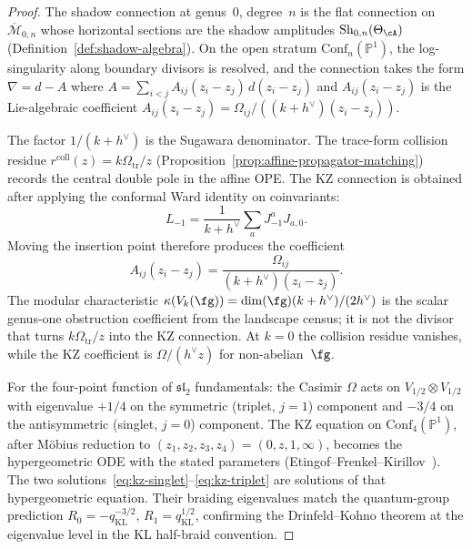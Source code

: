 \begin{proof}
The shadow connection at genus~$0$, degree~$n$ is the flat connection
on $\overline{\mathcal{M}}_{0,n}$ whose horizontal sections are
the shadow amplitudes $\operatorname{Sh}_{0,n}(\Theta_\cA)$
(Definition~\ref{def:shadow-algebra}). On the open stratum
$\mathrm{Conf}_n(\mathbb{P}^1)$, the log-singularity along boundary
divisors is resolved, and the connection takes the form
$\nabla = d - A$ where
$A = \sum_{i<j} A_{ij}(z_i-z_j)\, d(z_i-z_j)$
and $A_{ij}(z_i-z_j)$ is the Lie-algebraic coefficient
$A_{ij}(z_i-z_j) = \Omega_{ij}/((k + h^\vee)(z_i-z_j))$.

The factor $1/(k + h^\vee)$ is the Sugawara denominator. The
trace-form collision residue
$r^{\mathrm{coll}}(z)=k\Omega_{\mathrm{tr}}/z$
\textup{(}Proposition~\ref{prop:affine-propagator-matching}\textup{)}
records the central double pole in the affine OPE. The KZ
connection is obtained after applying the conformal Ward identity
on coinvariants:
\[
 L_{-1}
 = \frac{1}{k+h^\vee}\sum_a J^a_{-1}J_{a,0}.
\]
Moving the insertion point therefore produces the coefficient
\[
 A_{ij}(z_i-z_j)
 = \frac{\Omega_{ij}}{(k+h^\vee)(z_i-z_j)}.
\]
The modular characteristic
$\kappa(V_k(\fg))=\dim(\fg)(k+h^\vee)/(2h^\vee)$ is the scalar
genus-one obstruction coefficient from the landscape census; it is
not the divisor that turns
$k\Omega_{\mathrm{tr}}/z$ into the KZ connection. At $k=0$ the
collision residue vanishes, while the KZ coefficient is
$\Omega/(h^\vee z)$ for non-abelian~$\fg$.

For the four-point function of $\mathfrak{sl}_2$ fundamentals:
the Casimir $\Omega$ acts on $V_{1/2} \otimes V_{1/2}$ with
eigenvalue $+1/4$ on the symmetric (triplet, $j=1$) component
and $-3/4$ on the antisymmetric (singlet, $j=0$) component.
The KZ equation on $\mathrm{Conf}_4(\mathbb{P}^1)$, after
M\"obius reduction to $(z_1, z_2, z_3, z_4) = (0, z, 1, \infty)$,
becomes the hypergeometric ODE with the stated parameters
(Etingof--Frenkel--Kirillov~\cite{EFK98}).
The two solutions~\eqref{eq:kz-singlet}--\eqref{eq:kz-triplet} are
solutions of that hypergeometric equation.  Their braiding
eigenvalues match the quantum-group prediction
$R_0 = -q_{\mathrm{KL}}^{-3/2}$,
$R_1 = q_{\mathrm{KL}}^{1/2}$, confirming the
Drinfeld--Kohno theorem at the eigenvalue level in the KL
half-braid convention.
\end{proof}


